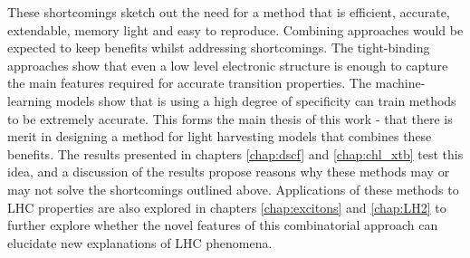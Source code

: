 These shortcomings sketch out the need for a method that is efficient, accurate,
extendable, memory light and easy to reproduce. Combining approaches would be expected
to keep benefits whilst addressing shortcomings. The tight-binding approaches show
that even a low level electronic structure is enough to capture the main features
required for accurate transition properties. The machine-learning models show that
is using a high degree of specificity can train methods to be extremely accurate.
This forms the main thesis of this work - that there is merit in designing a method
for light harvesting models that combines these benefits. The results presented in 
chapters \ref{chap:dscf} and \ref{chap:chl_xtb} test this idea, and a discussion
of the results propose reasons why these methods may or may not solve the shortcomings
outlined above. Applications of these methods to LHC properties are also explored
in chapters \ref{chap:excitons} and \ref{chap:LH2} to further explore whether the
novel features of this combinatorial approach can elucidate new explanations of
LHC phenomena.